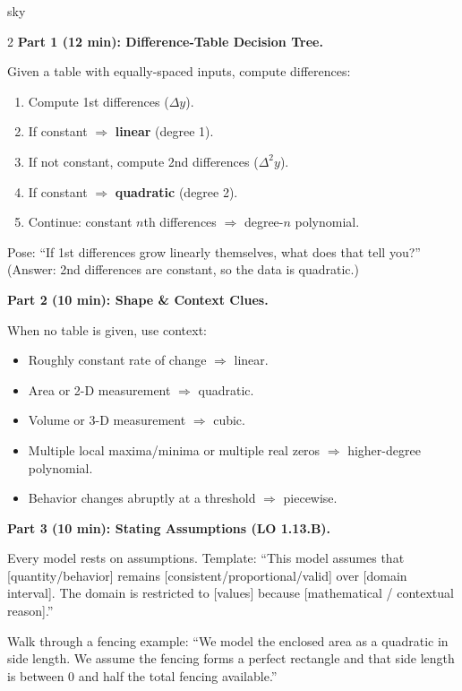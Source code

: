\documentclass[10pt]{article}
\begin{document}
\begin{skillbox}[Lesson]{sky}
\begin{multicols}{2}
\textbf{Part 1 (12 min): Difference-Table Decision Tree.}

Given a table with equally-spaced inputs, compute differences:
\begin{enumerate}[leftmargin=1.4em,itemsep=2pt,topsep=2pt]
  \item Compute 1st differences ($\Delta y$).
  \item If constant $\Rightarrow$ \textbf{linear} (degree 1).
  \item If not constant, compute 2nd differences ($\Delta^2 y$).
  \item If constant $\Rightarrow$ \textbf{quadratic} (degree 2).
  \item Continue: constant $n$th differences $\Rightarrow$ degree-$n$ polynomial.
\end{enumerate}

Pose: ``If 1st differences grow linearly themselves, what does that tell you?'' (Answer: 2nd
differences are constant, so the data is quadratic.)

\columnbreak

\textbf{Part 2 (10 min): Shape \& Context Clues.}

When no table is given, use context:
\begin{itemize}[leftmargin=1.4em,itemsep=2pt,topsep=2pt]
  \item Roughly constant rate of change $\Rightarrow$ linear.
  \item Area or 2-D measurement $\Rightarrow$ quadratic.
  \item Volume or 3-D measurement $\Rightarrow$ cubic.
  \item Multiple local maxima/minima or multiple real zeros $\Rightarrow$ higher-degree polynomial.
  \item Behavior changes abruptly at a threshold $\Rightarrow$ piecewise.
\end{itemize}

\textbf{Part 3 (10 min): Stating Assumptions (LO 1.13.B).}

Every model rests on assumptions. Template: ``This model assumes that
[quantity/behavior] remains [consistent/proportional/valid] over [domain interval].
The domain is restricted to [values] because [mathematical / contextual reason].''

Walk through a fencing example: ``We model the enclosed area as a quadratic in side length.
We assume the fencing forms a perfect rectangle and that side length is between 0 and half
the total fencing available.''
\end{multicols}
\end{skillbox}
\end{document}
